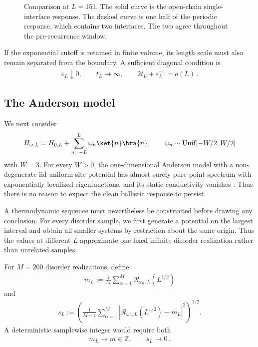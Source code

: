 \documentclass[a4paper,10pt]{article}
\numberwithin{equation}{section}
\theoremstyle{plain}
\theoremstyle{plain}
\theoremstyle{plain}
\theoremstyle{plain}
\theoremstyle{plain}
\theoremstyle{remark}
\theoremstyle{definition}
\theoremstyle{plain}
\newcommand{\ZZ}{\mathbb{Z}}
\newcommand{\calR}{\mathcal{R}}
\newcommand{\ve}{\varepsilon}
\newcommand{\eq}[1]{\begin{align*}#1\end{align*}}
\begin{document}
\begin{figure}[ht]
\caption{Comparison at $L=151$. The solid curve is the open-chain
single-interface response. The dashed curve is one half of the periodic
response, which contains two interfaces. The two agree throughout the
pre-recurrence window.}
\label{fig:boundary condition comparison}
\end{figure}

If the exponential cutoff is retained in finite volume, its length scale
must also remain separated from the boundary. A sufficient diagonal
condition is
\eq{\ve_L\downarrow0,\qquad
t_L\to\infty,\qquad
2t_L+\ve_L^{-1}=o(L)\,.}

\subsection{The Anderson model}

We next consider
\eq{H_{\omega,L}
=
H_{0,L}
+
\sum_{n=-L}^{L}\omega_n\ket{n}\bra{n},
\qquad
\omega_n\sim\operatorname{Unif}[-W/2,W/2]}
with $W=3$. For every $W>0$, the one-dimensional Anderson model with a
non-degenerate iid uniform site potential has almost surely pure point
spectrum with exponentially localized eigenfunctions, and its static
conductivity vanishes
\cite{Kunz1980,frohlichConstructiveProofLocalization1985,Anderson_1958_PhysRev.109.1492,MottTwose1961,LeeRamakrishnan1985}.
Thus there is no reason to expect the clean ballistic response to
persist. 

A thermodynamic sequence must nevertheless be constructed before drawing
any conclusion. For every disorder sample, we first generate a potential on
the largest interval and obtain all smaller systems by restriction about the
same origin. Thus the values at different $L$ approximate one fixed infinite
disorder realization rather than unrelated samples.

For $M=200$ disorder realizations, define
\eq{m_L
:=
\frac{1}{M}\sum_{\alpha=1}^{M}
\calR_{\omega_\alpha,L}(L^{1/2})}
and
\eq{s_L
:=
\left(
\frac{1}{M-1}
\sum_{\alpha=1}^{M}
\left|
\calR_{\omega_\alpha,L}(L^{1/2})-m_L
\right|^2
\right)^{1/2}.}
A deterministic samplewise integer would require both
\eq{m_L\longrightarrow m\in\ZZ,
\qquad
s_L\longrightarrow0\,.}
\end{document}
